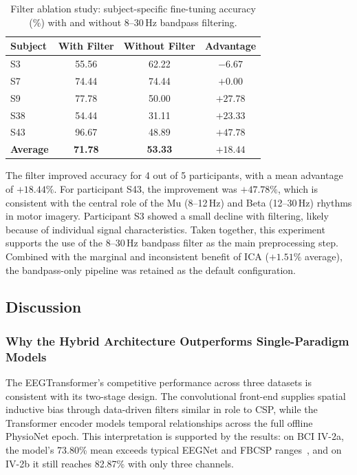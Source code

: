\documentclass[12pt, a4paper]{article}
\begin{document}
\begin{table}[htbp]
\centering
\caption{Filter ablation study: subject-specific fine-tuning accuracy (\%) with and without 8--30\,Hz bandpass filtering.}
\label{tab:filter_ablation}
\begin{tabular}{lccc}
\toprule
Subject & With Filter & Without Filter & Advantage \\
\midrule
S3  & 55.56 & 62.22 & $-6.67$ \\
S7  & 74.44 & 74.44 & $+0.00$ \\
S9  & 77.78 & 50.00 & $+27.78$ \\
S38 & 54.44 & 31.11 & $+23.33$ \\
S43 & 96.67 & 48.89 & $+47.78$ \\
\midrule
\textbf{Average} & \textbf{71.78} & \textbf{53.33} & $\mathbf{+18.44}$ \\
\bottomrule
\end{tabular}
\end{table}

The filter improved accuracy for 4 out of 5 participants, with a mean advantage of $+18.44\%$. For participant S43, the improvement was $+47.78\%$, which is consistent with the central role of the Mu (8--12\,Hz) and Beta (12--30\,Hz) rhythms in motor imagery. Participant S3 showed a small decline with filtering, likely because of individual signal characteristics. Taken together, this experiment supports the use of the 8--30\,Hz bandpass filter as the main preprocessing step. Combined with the marginal and inconsistent benefit of ICA ($+1.51\%$ average), the bandpass-only pipeline was retained as the default configuration.

\subsection{Discussion}

\subsubsection{Why the Hybrid Architecture Outperforms Single-Paradigm Models}
\label{sec:disc_hybrid}

The EEGTransformer's competitive performance across three datasets is consistent with its two-stage design. The convolutional front-end supplies spatial inductive bias through data-driven filters similar in role to CSP, while the Transformer encoder models temporal relationships across the full offline PhysioNet epoch. This interpretation is supported by the results: on BCI IV-2a, the model's 73.80\% mean exceeds typical EEGNet and FBCSP ranges~\cite{hameed2025enhancing}, and on IV-2b it still reaches 82.87\% with only three channels.
\end{document}
